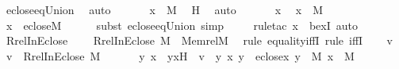 \begin{isabellebody}
\ eclose{\isacharunderscore}{\kern0pt}eq{\isacharunderscore}{\kern0pt}Union\ \isamarkupfalse%
\ auto\ \isanewline
\ \ \isamarkupfalse%
\ \isamarkupfalse%
\ {\isachardoublequoteopen}x\ {\isasymin}\ M{\isachardoublequoteclose}\ \isamarkupfalse%
\ H\ \isamarkupfalse%
\ auto\ \isanewline
{}\isamarkupfalse%
\ \isanewline
\ \ \isamarkupfalse%
\ x\ \isamarkupfalse%
\ {\isachardoublequoteopen}x\ {\isasymin}\ M{\isachardoublequoteclose}\ \isanewline
\ \ \isamarkupfalse%
\ \isamarkupfalse%
\ {\isachardoublequoteopen}x\ {\isasymin}\ eclose{\isacharparenleft}{\kern0pt}M{\isacharparenright}{\kern0pt}{\isachardoublequoteclose}\ \isanewline
\ \ \ \ \isamarkupfalse%
{\isacharparenleft}{\kern0pt}subst\ eclose{\isacharunderscore}{\kern0pt}eq{\isacharunderscore}{\kern0pt}Union{\isacharcomma}{\kern0pt}\ simp{\isacharparenright}{\kern0pt}\isanewline
\ \ \ \ \isamarkupfalse%
{\isacharparenleft}{\kern0pt}rule{\isacharunderscore}{\kern0pt}tac\ x{\isacharequal}{\kern0pt}{}\ \ bexI{\isacharcomma}{\kern0pt}\ auto{\isacharparenright}{\kern0pt}\isanewline
\ \ \ \ \isamarkupfalse%
\isanewline
{}\isamarkupfalse%
%
\endisatagproof
{\isafoldproof}%
%
\isadelimproof
\isanewline
%
\endisadelimproof
\isanewline
{}\isamarkupfalse%
\ Rrel{\isacharunderscore}{\kern0pt}InEclose\ {\isacharcolon}{\kern0pt}\ \isanewline
\ \ {\isachardoublequoteopen}Rrel{\isacharparenleft}{\kern0pt}InEclose{\isacharcomma}{\kern0pt}\ M{\isacharparenright}{\kern0pt}\ {\isacharequal}{\kern0pt}\ Memrel{\isacharparenleft}{\kern0pt}M{\isacharparenright}{\kern0pt}{\isacharcircum}{\kern0pt}{\isacharplus}{\kern0pt}{\isachardoublequoteclose}\ \isanewline
%
\isadelimproof
%
\endisadelimproof
%
\isatagproof
{}\isamarkupfalse%
\ {\isacharparenleft}{\kern0pt}rule\ equality{\isacharunderscore}{\kern0pt}iffI{\isacharcomma}{\kern0pt}\ rule\ iffI{\isacharparenright}{\kern0pt}\isanewline
\ \ \isamarkupfalse%
\ v\ \isamarkupfalse%
\ {\isachardoublequoteopen}v\ {\isasymin}\ Rrel{\isacharparenleft}{\kern0pt}InEclose{\isacharcomma}{\kern0pt}\ M{\isacharparenright}{\kern0pt}{\isachardoublequoteclose}\ \isanewline
\ \ \isamarkupfalse%
\ \isamarkupfalse%
\ y\ x\ \ yxH\ {\isacharcolon}{\kern0pt}\ {\isachardoublequoteopen}v\ {\isacharequal}{\kern0pt}\ {\isacharless}{\kern0pt}y{\isacharcomma}{\kern0pt}\ x{\isachargreater}{\kern0pt}{\isachardoublequoteclose}\ {\isachardoublequoteopen}y\ {\isasymin}\ eclose{\isacharparenleft}{\kern0pt}x{\isacharparenright}{\kern0pt}{\isachardoublequoteclose}\ {\isachardoublequoteopen}y\ {\isasymin}\ M{\isachardoublequoteclose}\ {\isachardoublequoteopen}x\ {\isasymin}\ M{\isachardoublequoteclose}\ \isamarkupfalse%

\end{isabellebody}
